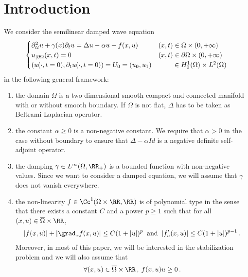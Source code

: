 \section{Introduction}

We consider the semilinear damped wave equation
\begin{equation}\label{eq}
\begin{cases}
\partial_{tt}^2 u + \gamma(x)\partial_t u = \Delta u - \alpha u - f(x,u)\:&(x,t)\in\Omega\times (0,+\infty)\\
u_{|\partial\Omega}(x,t)=0&(x,t)\in\partial\Omega\times (0,+\infty)\\
\left(u(\cdot,t=0),\partial_t u(\cdot,t=0)\right)=U_0=(u_0,u_1)& \mkern43mu\in H^1_0(\Omega)\times L^2(\Omega)
\end{cases}
\end{equation}
in the following general framework:
\begin{enumerate}\romanenumi
\item \label{listintro1.1}the domain $\Omega$ is a two-dimensional smooth compact and connected manifold with or without smooth boundary. If $\Omega$ is not flat, $\Delta$ has to be taken as Beltrami Laplacian operator.
\item \label{listintro1.2}the constant $\alpha\geq 0$ is a non-negative constant. We require that $\alpha>0$ in the case without boundary to ensure that $\Delta-\alpha Id$ is a negative definite self-adjoint operator.
\item \label{listintro1.3}the damping $\gamma\in L^\infty(\Omega,\RR_+)$ is a bounded function with non-negative values. Since we want to consider a damped equation, we will assume that $\gamma$ does not vanish everywhere.
\item \label{listintro1.4}the non-linearity $f\in\Cc^1(\overline\Omega\times\RR,\RR)$ is of polynomial type in the sense that there exists a constant $C$ and a power $p\geq 1$ such that for all $(x,u)\in \overline\Omega\times\RR$,
\begin{equation}\label{hyp-f-estim}
|f(x,u)|+|\grad_xf(x,u)|\leq C(1+|u|)^p\:\text{ and }\:|f'_u(x,u)|\leq C(1+|u|)^{p-1}\,.
\end{equation}
Moreover, in most of this paper, we will be interested in the stabilization problem and we will also assume that
\begin{equation}\label{hyp-f-sign}
\forall (x,u)\in \overline\Omega\times\RR\,,\:f(x,u)u\geq 0\,.
\end{equation}
\end{enumerate}


